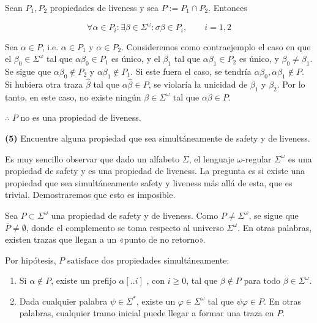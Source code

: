 \documentclass[a4paper, 12pt]{article}
\begin{document}
Sean $P_1, P_2$ propiedades de liveness y sea $P := P_1 \cap P_2$. Entonces 

\begin{equation*}
    \forall \alpha \in P_i : \exists  \beta \in \Sigma^\omega : \sigma\beta \in
    P_i, \qquad i = 1, 2
\end{equation*}

Sea $\alpha \in P$, i.e. $\alpha \in P_1$ y $\alpha \in P_2$. Consideremos como
contraejemplo el caso en que el
$\beta_0 \in \Sigma^\omega$ tal que $\alpha\beta_0 \in
P_1$ es único, y el $\beta_1$ tal que $\alpha\beta_1 \in
P_2$ es único, y $\beta_0 \neq \beta_1$. Se sigue que $\alpha\beta_0 \not\in
P_2$ y $\alpha\beta_1 \not\in P_1$. Si este fuera el caso, se tendría
$\alpha\beta_0, \alpha\beta_1 \not\in P$. Si hubiera otra traza $\hat{\beta}$
tal que $\alpha\hat{\beta} \in P$, se violaría la unicidad de $\beta_1$ y
$\beta_2$. Por lo tanto, en este caso, no existe ningún $\beta \in
\Sigma^\omega$ tal que $\alpha\beta \in P$. 

$\therefore $ $P$ no es una propiedad de liveness.

\pagebreak 

\begin{myframe}
    \textbf{(5)} Encuentre alguna propiedad que sea simultáneamente de safety y de liveness.
\end{myframe}

Es muy sencillo observar que dado un alfabeto $\Sigma$, el lenguaje
$\omega$-regular $\Sigma^\omega$ es una propiedad de safety y es una propiedad
de liveness. La pregunta es si existe una propiedad que sea simultáneamente
safety y liveness más allá de esta, que es trivial. Demostraremos que esto es
imposible.

Sea $P \subset \Sigma^\omega$ una propiedad de safety y de liveness. Como $P
\neq \Sigma^\omega$, se sigue que $\overline{P} \neq \emptyset$, donde el
complemento se toma respecto al universo $\Sigma^\omega$. En otras palabras,
existen trazas que llegan a un «punto de no retorno». 

Por hipótesis, $P$ satisface dos propiedades simultáneamente:


\begin{enumerate}
    \item Si $\alpha \not\in  P$, existe un prefijo $\alpha[..i]$
        , con $i \geq 0$, tal que $\beta \not\in P$ para todo $\beta \in
        \Sigma^\omega$.
    \item Dada cualquier palabra $\psi \in \Sigma^*$, existe un $\varphi \in
        \Sigma^\omega$ tal que $\psi\varphi \in P$. En otras palabras, cualquier
        tramo inicial puede llegar a formar una traza en $P$.
\end{enumerate}
\end{document}
